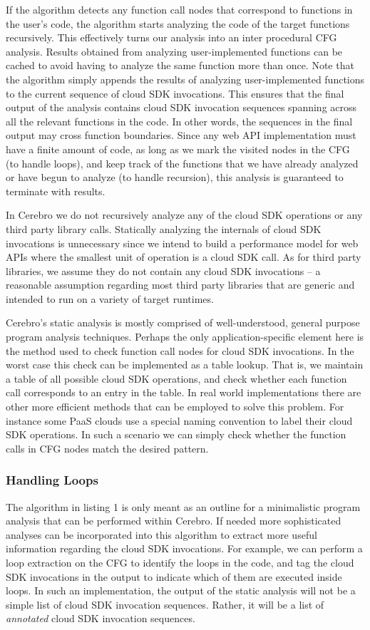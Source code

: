 If the algorithm detects any function call nodes that correspond to functions in the user's code, the algorithm
starts analyzing the code of the target functions recursively. This effectively turns our analysis into an inter procedural
CFG analysis. Results obtained from analyzing user-implemented functions can be cached to avoid
having to analyze the same function more than once. Note that the algorithm simply appends the results of
analyzing user-implemented functions to the current sequence of cloud SDK invocations. This ensures that the final output of the
analysis contains cloud SDK invocation sequences spanning across all the relevant functions in the code. 
In other words, the sequences in the final output may cross function boundaries.
Since any web API implementation must have a finite amount of code, as long as
we mark the visited nodes in the CFG (to handle loops), and keep track of the functions that we have 
already analyzed or have begun to analyze (to handle recursion), this analysis is guaranteed to terminate with results.

In Cerebro we do not recursively analyze any of the cloud
SDK operations or any third party library calls. 
Statically analyzing the internals of cloud SDK invocations is
unnecessary since we intend to build a performance model for web APIs where
the smallest unit of operation is a cloud SDK call. As for third 
party libraries, we assume they do not contain any cloud SDK invocations -- a reasonable assumption 
regarding most third party libraries that are generic and intended to run on a variety of target runtimes. 
 
Cerebro's static analysis is mostly comprised of well-understood, general purpose program analysis techniques.
 Perhaps the only application-specific element here is the method used to check function call nodes for cloud SDK invocations.
 In the worst case this check can be implemented as a table lookup. That is, we maintain a table of all possible cloud
 SDK operations, and check whether each function call
 corresponds to an entry in the table. In real world implementations there are other more efficient methods that
 can be employed to solve this problem. For instance some PaaS clouds use a special naming convention to label
 their cloud SDK operations. 
 In such a scenario we can simply check whether the function calls in CFG nodes match the
 desired pattern. 
 
 \subsubsection{Handling Loops}
The algorithm in listing 1 is only meant as an outline for a minimalistic program analysis that can be performed
within Cerebro. If needed more sophisticated analyses can be incorporated into this algorithm to extract more
useful information regarding the cloud SDK invocations. For example, we can perform a loop extraction on the
CFG to identify the loops in the code, and tag the cloud SDK invocations in the output to indicate which of them
are executed inside loops. In such an implementation, the output of the static analysis will not be a simple
list of cloud SDK invocation sequences. Rather, it will be a list of \textit{annotated} cloud SDK invocation sequences.


